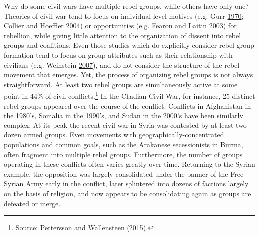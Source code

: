 \documentclass[12pt,]{book}
\let\rmarkdownfootnote\footnote%
\def\footnote{\protect\rmarkdownfootnote}
\theoremstyle{definition}
\theoremstyle{definition}
\theoremstyle{definition}
\theoremstyle{remark}
\begin{document}
Why do some civil wars have multiple rebel groups, while others have
only one? Theories of civil war tend to focus on individual-level
motives (e.g. Gurr \protect\hyperlink{ref-gurr70}{1970}; Collier and
Hoeffler \protect\hyperlink{ref-Collier2004}{2004}) or opportunities
(e.g. Fearon and Laitin \protect\hyperlink{ref-fearonlaitin03}{2003})
for rebellion, while giving little attention to the organization of
dissent into rebel groups and coalitions. Even those studies which do
explicitly consider rebel group formation tend to focus on group
attributes such as their relationship with civilians (e.g. Weinstein
\protect\hyperlink{ref-Weinstein2007}{2007}), and do not consider the
structure of the rebel movement that emerges. Yet, the process of
organizing rebel groups is not always straightforward. At least two
rebel groups are simultaneously active at some point in 44\% of civil
conflicts.\footnote{Source: Pettersson and Wallensteen
  (\protect\hyperlink{ref-Pettersson2015a}{2015}).} In the Chadian Civil
War, for instance, 25 distinct rebel groups appeared over the course of
the conflict. Conflicts in Afghanistan in the 1980's, Somalia in the
1990's, and Sudan in the 2000's have been similarly complex. At its peak
the recent civil war in Syria was contested by at least two dozen armed
groups. Even movements with geographically-concentrated populations and
common goals, such as the Arakanese secessionists in Burma, often
fragment into multiple rebel groups. Furthermore, the number of groups
operating in these conflicts often varies greatly over time. Returning
to the Syrian example, the opposition was largely consolidated under the
banner of the Free Syrian Army early in the conflict, later splintered
into dozens of factions largely on the basis of religion, and now
appears to be consolidating again as groups are defeated or merge.
\end{document}
